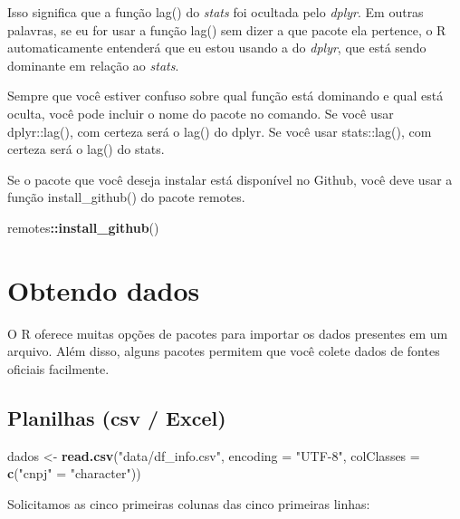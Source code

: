 \documentclass[
]{book}
\newenvironment{Shaded}{\begin{snugshade}}{\end{snugshade}}
\newcommand{\DataTypeTok}[1]{\textcolor[rgb]{0.13,0.29,0.53}{#1}}
\newcommand{\KeywordTok}[1]{\textcolor[rgb]{0.13,0.29,0.53}{\textbf{#1}}}
\newcommand{\NormalTok}[1]{#1}
\newcommand{\OperatorTok}[1]{\textcolor[rgb]{0.81,0.36,0.00}{\textbf{#1}}}
\newcommand{\StringTok}[1]{\textcolor[rgb]{0.31,0.60,0.02}{#1}}
\begin{document}
Isso significa que a função lag() do \emph{stats} foi ocultada pelo \emph{dplyr}. Em outras palavras, se eu for usar a função lag() sem dizer a que pacote ela pertence, o R automaticamente entenderá que eu estou usando a do \emph{dplyr}, que está sendo dominante em relação ao \emph{stats}.

Sempre que você estiver confuso sobre qual função está dominando e qual está oculta, você pode incluir o nome do pacote no comando. Se você usar dplyr::lag(), com certeza será o lag() do dplyr. Se você usar stats::lag(), com certeza será o lag() do stats.

Se o pacote que você deseja instalar está disponível no Github, você deve usar a função install\_github() do pacote remotes.

\begin{Shaded}
\begin{Highlighting}[]
\NormalTok{remotes}\OperatorTok{::}\KeywordTok{install_github}\NormalTok{()}
\end{Highlighting}
\end{Shaded}

\hypertarget{obtendo-dados}{%
\chapter{Obtendo dados}\label{obtendo-dados}}

O R oferece muitas opções de pacotes para importar os dados presentes em um arquivo. Além disso, alguns pacotes permitem que você colete dados de fontes oficiais facilmente.

\hypertarget{planilhas-csv-excel}{%
\section{Planilhas (csv / Excel)}\label{planilhas-csv-excel}}

\begin{Shaded}
\begin{Highlighting}[]
\NormalTok{dados <-}\StringTok{ }\KeywordTok{read.csv}\NormalTok{(}\StringTok{"data/df_info.csv"}\NormalTok{, }\DataTypeTok{encoding =} \StringTok{"UTF-8"}\NormalTok{, }\DataTypeTok{colClasses =} \KeywordTok{c}\NormalTok{(}\StringTok{"cnpj"}\NormalTok{ =}\StringTok{ "character"}\NormalTok{))}
\end{Highlighting}
\end{Shaded}

Solicitamos as cinco primeiras colunas das cinco primeiras linhas:
\end{document}
